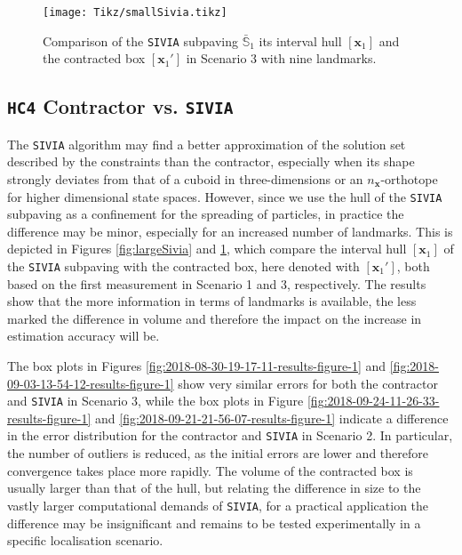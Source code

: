 \begin{figure}
	\centering
	\setlength{} 	
	\setlength{}		
	\texttt{[image: Tikz/smallSivia.tikz]}	
	\caption[Comparison of a \texttt{SIVIA} subpaving and a contracted box in Scenario 3.]{Comparison of the \texttt{SIVIA} subpaving $\bar{\mathbb{S}}_1$ its interval hull $[\bm{x}_1]$ and the contracted box $[\bm{x}_1']$ in Scenario 3 with nine landmarks.}			
	\label{fig:smallSivia}			
\end{figure}

\subsection{\texttt{HC4} Contractor vs. \texttt{SIVIA}}\label{contrvssivia}

The \texttt{SIVIA} algorithm may find a better approximation of the solution set described by the constraints than the contractor, especially when its shape strongly deviates from that of a cuboid in three-dimensions or an $n_{\bm{x}}$-orthotope for higher dimensional state spaces. However, since we use the hull of the \texttt{SIVIA} subpaving as a confinement for the spreading of particles, in practice the difference may be minor, especially for an increased number of  landmarks. This is depicted in Figures \ref{fig:largeSivia} and \ref{fig:smallSivia}, which compare the interval hull $[\bm{x}_1]$ of the \texttt{SIVIA} subpaving with the contracted box, here denoted with $[\bm{x}_1']$, both based on the first measurement in Scenario 1 and 3, respectively. The results show that the more information in terms of landmarks is available, the less marked the difference in volume and therefore the impact on the increase in estimation accuracy will be.

The box plots in Figures \ref{fig:2018-08-30-19-17-11-results-figure-1} and \ref{fig:2018-09-03-13-54-12-results-figure-1} show very similar errors for both the contractor and \texttt{SIVIA} in Scenario 3, while the box plots in Figure \ref{fig:2018-09-24-11-26-33-results-figure-1} and \ref{fig:2018-09-21-21-56-07-results-figure-1} indicate a difference in the error distribution for the contractor and \texttt{SIVIA} in Scenario 2. In particular, the number of outliers is reduced, as the initial errors are lower and therefore convergence  takes place more rapidly. The volume of the contracted box is usually larger than that of the hull, but relating the difference in size to the vastly larger computational demands of \texttt{SIVIA}, for a practical application the difference may be insignificant and remains to be tested experimentally in a specific localisation scenario. 






